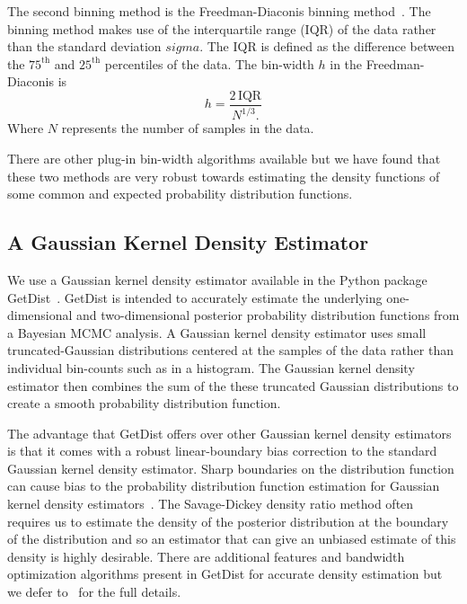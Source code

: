 The second binning method is the Freedman-Diaconis binning method~\cite{Freedman1981}. The binning method makes use of the interquartile range (IQR) of the data rather than the standard deviation $sigma$. The IQR is defined as the difference between the $75^{\mathrm{th}}$ and $25^{\mathrm{th}}$ percentiles of the data. The bin-width $h$ in the Freedman-Diaconis is
\begin{equation}
    h = \frac{2 \, \mathrm{IQR}}{N^{1/3}.}
\end{equation}
Where $N$ represents the number of samples in the data.

There are other plug-in bin-width algorithms available but we have found that these two methods are very robust towards estimating the density functions of some common and expected probability distribution functions.

\subsection{A Gaussian Kernel Density Estimator}
We use a Gaussian kernel density estimator available in the Python package GetDist~\citep{lewis2015getdist}. GetDist is intended to accurately estimate the underlying one-dimensional and two-dimensional posterior probability distribution functions from a Bayesian MCMC analysis. A Gaussian kernel density estimator uses small truncated-Gaussian distributions centered at the samples of the data rather than individual bin-counts such as in a histogram. The Gaussian kernel density estimator then combines the sum of the these truncated Gaussian distributions to create a smooth probability distribution function.

The advantage that GetDist offers over other Gaussian kernel density estimators is that it comes with a robust linear-boundary bias correction to the standard Gaussian kernel density estimator. Sharp boundaries on the distribution function can cause bias to the probability distribution function estimation for Gaussian kernel density estimators~\citep{lewis2015getdist}. The Savage-Dickey density ratio method often requires us to estimate the density of the posterior distribution at the boundary of the distribution and so an estimator that can give an unbiased estimate of this density is highly desirable. There are additional features and bandwidth optimization algorithms present in GetDist for accurate density estimation but we defer to~\cite{lewis2015getdist} for the full details.

